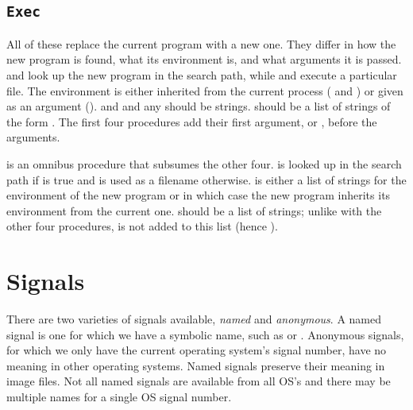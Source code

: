 \subsection{{\tt Exec}}

\begin{protos}
\end{protos}
\noindent
All of these replace the current program with a new one.
They differ in how the new program is found, what its environment is,
 and what arguments it is passed.
 and 
 look up the new program in the search path,
 while  and 
 execute a particular file.
The environment is either inherited from the current process
 ( and ) or given as an argument
 ().
 and  and any  should be strings.
  should be a list of strings of the form
 .
The first four procedures add their first argument,  or
 , before the  arguments.

 is an omnibus procedure that subsumes the other
 four.
 is looked up in the search path if  is true
 and is used as a filename otherwise.
 is either a list of strings for the environment of the
 new program or  in which case the new program inherits its
 environment from the current one.
 should be a list of strings; unlike with the other four
 procedures,  is not added to this list (hence ).

\section{Signals}

There are two varieties of signals available, {\em named} and {\em anonymous}.
A named signal is one for which we have a symbolic name, such as 
 or .  
Anonymous signals, for which we only have the current operating system's
 signal number, have no meaning in other operating systems.
Named signals preserve their meaning in image files.
Not all named signals are available from all OS's and
 there may be multiple names for a single OS signal number.

